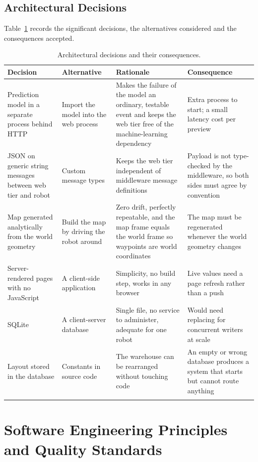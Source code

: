 \documentclass[12pt,a4paper]{report}
\begin{document}
\section{Architectural Decisions}
Table~\ref{tab:adr} records the significant decisions, the alternatives considered and the
consequences accepted.

\begin{longtable}{@{}p{}p{}p{}p{}@{}}
\toprule
\textbf{Decision} & \textbf{Alternative} & \textbf{Rationale} & \textbf{Consequence} \\
\midrule
\endhead
Prediction model in a separate process behind HTTP & Import the model into the web process &
Makes the failure of the model an ordinary, testable event and keeps the web tier free of the
machine-learning dependency & Extra process to start; a small latency cost per preview \\
JSON on generic string messages between web tier and robot & Custom message types &
Keeps the web tier independent of middleware message definitions & Payload is not type-checked by
the middleware, so both sides must agree by convention \\
Map generated analytically from the world geometry & Build the map by driving the robot around &
Zero drift, perfectly repeatable, and the map frame equals the world frame so waypoints are world
coordinates & The map must be regenerated whenever the world geometry changes \\
Server-rendered pages with no JavaScript & A client-side application &
Simplicity, no build step, works in any browser & Live values need a page refresh rather than a
push \\
SQLite & A client-server database &
Single file, no service to administer, adequate for one robot & Would need replacing for
concurrent writers at scale \\
Layout stored in the database & Constants in source code &
The warehouse can be rearranged without touching code & An empty or wrong database produces a
system that starts but cannot route anything \\
\bottomrule
\caption{Architectural decisions and their consequences.}
\label{tab:adr}
\end{longtable}

\chapter{Software Engineering Principles and Quality Standards}
\label{ch:quality}
\end{document}
